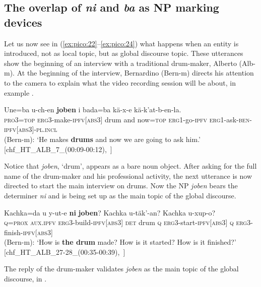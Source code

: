 \documentclass[output=paper
,modfonts
,nonflat]{langsci/langscibook}
\begin{document}
\subsection{The overlap of \textit{ni} and \textit{ba} as NP marking devices}\label{sec:pico:3.4}\largerpage


Let us now see in (\ref{ex:pico:22}--\ref{ex:pico:24}) what happens when an entity is introduced, not as local topic, but as global discourse topic. These utterances show the beginning of an interview with a traditional drum-maker, Alberto (Alb-m). At the beginning of the interview, Bernardino (Bern-m) directs his attention to the camera to explain what the video recording session will be about, in example .

\ea  \label{ex:pico:22}

\gll Une=ba u-ch-en \textbf{joben} i bada=ba k\"a-x-e k\"a-k'at-b-en-la.\\
\textsc{pro3}=\textsc{top} \textsc{erg3}-make-\textsc{ipfv[abs3]} {drum} and {now}=\textsc{top} \textsc{erg1}-go-\textsc{ipfv} \textsc{erg1}-ask-\textsc{ben}-\textsc{ipfv[abs3]}-\textsc{pl.incl}\\
\glt (Bern-m): `He makes \textbf{drums} and now we are going to ask him.' [chf\_HT\_ALB\_7\_(00:09-00:12),~\citealt{Delgado-Galvan2018archive}]
\z

Notice that \textit{joben}, `drum', appears as a bare noun object. After asking for the full name of the drum-maker and his professional activity, the next utterance  is now directed to start the main interview on drums. Now the NP \textit{joben} bears the determiner \textit{ni} and is being set up as the main topic of the global discourse.


\ea  \label{ex:pico:23}

\gll Kachka=da  u y-ut-e \textbf{ni} \textbf{joben}? Kachka u-täk'-an?  Kachka u-xup-o?\\
\textsc{q=prox} \textsc{aux.ipfv} \textsc{erg3}-build-\textsc{ipfv[abs3]} \textsc{det} {drum} \textsc{q} \textsc{erg3}-start-\textsc{ipfv[abs3]} {\textsc q} \textsc{erg3}-finish-\textsc{ipfv[abs3]}\\
\glt (Bern-m): `How is \textbf{the drum} made? How is it started? How is it finished?' [chf\_HT\_ALB\_27-28\_(00:35-00:39),~\citealt{Delgado-Galvan2018archive}]
\z

The reply of the drum-maker validates \textit{joben} as the main topic of the global discourse, in .
\end{document}

